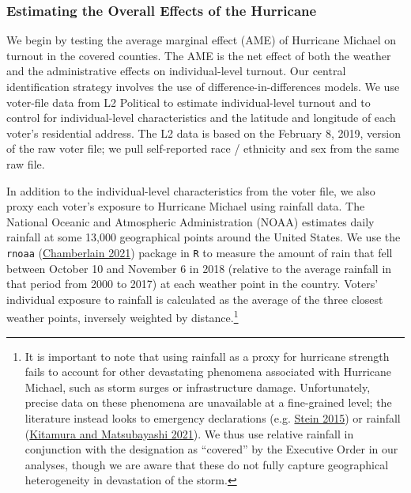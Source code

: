 \documentclass[
  12pt,
]{article}
\begin{document}
\hypertarget{estimating-the-overall-effects-of-the-hurricane}{%
\subsubsection*{Estimating the Overall Effects of the Hurricane}\label{estimating-the-overall-effects-of-the-hurricane}}

We begin by testing the average marginal effect (AME) of Hurricane Michael on turnout in the covered counties. The AME is the net effect of both the weather and the administrative effects on individual-level turnout. Our central identification strategy involves the use of difference-in-differences models. We use voter-file data from L2 Political to estimate individual-level turnout and to control for individual-level characteristics and the latitude and longitude of each voter's residential address. The L2 data is based on the February 8, 2019, version of the raw voter file; we pull self-reported race / ethnicity and sex from the same raw file.

In addition to the individual-level characteristics from the voter file, we also proxy each voter's exposure to Hurricane Michael using rainfall data. The National Oceanic and Atmospheric Administration (NOAA) estimates daily rainfall at some 13,000 geographical points around the United States. We use the \texttt{rnoaa} (\protect\hyperlink{ref-Chamberlain2021}{Chamberlain 2021}) package in \texttt{R} to measure the amount of rain that fell between October 10 and November 6 in 2018 (relative to the average rainfall in that period from 2000 to 2017) at each weather point in the country. Voters' individual exposure to rainfall is calculated as the average of the three closest weather points, inversely weighted by distance.\footnote{It is important to note that using rainfall as a proxy for hurricane strength fails to account for other devastating phenomena associated with Hurricane Michael, such as storm surges or infrastructure damage. Unfortunately, precise data on these phenomena are unavailable at a fine-grained level; the literature instead looks to emergency declarations (e.g. \protect\hyperlink{ref-Stein2015}{Stein 2015}) or rainfall (\protect\hyperlink{ref-Kitamura2021}{Kitamura and Matsubayashi 2021}). We thus use relative rainfall in conjunction with the designation as ``covered'' by the Executive Order in our analyses, though we are aware that these do not fully capture geographical heterogeneity in devastation of the storm.}
\end{document}
